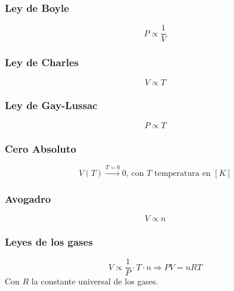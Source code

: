         \begin{multicols}{2}
            \subsubsection{Ley de Boyle}
            
            \begin{equation}
            \label{boyle}
                P \propto \frac{1}{V}
            \end{equation}
            
            \subsubsection{Ley de Charles}
            
            \begin{equation}
            \label{charles}
                V \propto T
            \end{equation}
            
            \subsubsection{Ley de Gay-Lussac}
            
            \begin{equation}
            \label{gay_lussac}
                P \propto T
            \end{equation}
            
            \subsubsection{Cero Absoluto}
            
            \begin{equation}
                V(T) \overset{T=0}{\rightarrow} 0 \text{, con }T\text{ temperatura en }[K]
            \end{equation}
            
            \subsubsection{Avogadro}
            
            \begin{equation}
                V \propto n
            \end{equation}
        
            \subsubsection{Leyes de los gases}
            
            \begin{equation}
                V \propto \frac{1}{P} \cdot T \cdot n \Rightarrow PV = nRT
            \end{equation}
             Con \(R\) la constante universal de los gases.
        \end{multicols}
        
